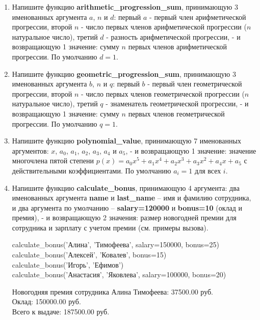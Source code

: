 \documentclass[a4,12pt]{article}
\theoremstyle{remark}
\begin{document}
\begin{enumerate}
    \item Напишите функцию \textbf{arithmetic\_progression\_sum}, принимающую 3 именованных аргумента $a$, $n$ и $d$: первый $a$ - первый член арифметической прогрессии, второй $n$ - число первых членов арифметической прогрессии ($n$ натуральное число), третий $d$ - разность арифметической прогрессии, - и возвращающую 1 значение: сумму $n$ первых членов арифметической прогрессии. По умолчанию $d=1$.
    \item Напишите функцию \textbf{geometric\_progression\_sum}, принимающую 3 именованных аргумента $b$, $n$ и $q$: первый $b$ - первый член геометрической прогрессии, второй $n$ - число первых членов геометрической прогрессии ($n$ натуральное число), третий $q$ - знаменатель геометрической прогрессии, - и возвращающую 1 значение: сумму $n$ первых членов геометрической прогрессии. По умолчанию $q=1$.
    \item Напишите функцию \textbf{polynomial\_value}, принимающую 7 именованных аргументов: $x$, $a_0$, $a_1$, $a_2$, $a_3$, $a_4$ и $a_5$, - и возвращающую 1 значение: значение многочлена пятой степени $p(x)=a_0x^5+a_1x^4+a_2x^3+a_3x^2+a_4x+a_5$ с действительными коэффициентами. По умолчанию $a_i = 1$ для всех $i$.
    \item Напишите функцию \textbf{calculate\_bonus}, принимающую 4 аргумента: два именованных аргумента \textbf{name} и \textbf{last\_name} – имя и фамилию сотрудника, и два аргумента по умолчанию – \textbf{salary=120000} и \textbf{bonus=10} (оклад и премия), - и возвращающую 2 значения: размер новогодней премии для сотрудника и зарплату с учетом премии (см. примеры вызова).
    
    \begin{inputformat}[title=Примеры вызова функции]
        calculate\_bonus('Алина', 'Тимофеева', salary=150000, bonus=25) \\
        calculate\_bonus('Алексей', 'Ковалев', bonus=15) \\
        calculate\_bonus('Игорь', 'Ефимов') \\
        calculate\_bonus('Анастасия', 'Яковлева', salary=100000, bonus=20) 
    \end{inputformat}
            
    \begin{outputformat}[title=Вывод]
        Новогодняя премия сотрудника Алина Тимофеева: 37500.00 руб. \\
    Оклад: 150000.00 руб. \\
    Всего к выдаче: 187500.00 руб. \\


\end{outputformat}
\end{enumerate}
\end{document}
